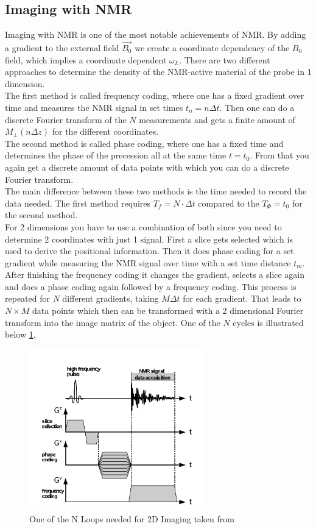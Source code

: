 \subsection{Imaging with NMR}\label{imagening}
Imaging with NMR is one of the most notable achievements of NMR. By adding a gradient to the external field $\vec{B_0}$ we create a coordinate dependency of the $B_0$ field, which implies a coordinate dependent $\omega_L$. There are two different approaches to determine the density of the NMR-active material of the probe in 1 dimension.
\vspace{2mm}\\
The first method is called frequency coding, where one has a fixed gradient over time and measures the  NMR signal in set times $t_n = n \Delta t$. Then one can do a discrete Fourier transform of the $N$ measurements and gets a finite amount of $M_{\perp}(n \Delta z)$ for the different coordinates. 
\vspace{2mm}\\
The second method is called phase coding, where one has a fixed time and determines the phase of the precession all at the same time $t = t_0$. From that you again get a discrete amount of data points with which you can do a discrete Fourier transform. 
\vspace{2mm}\\
The main difference between these two methods is the time needed to record the data needed. The first method requires $T_f = N \cdot \Delta t$ compared to the $T_{\Phi} = t_0$ for the second method.
\vspace{3mm}\\
For 2 dimensions you have to use a combination of both since you need to determine 2 coordinates with just 1 signal. First a slice gets selected which is used to derive the positional information. Then it does phase coding for a set gradient while measuring the NMR signal over time with a set time distance $t_m$. After finishing the frequency coding it changes the gradient, selects a slice again and does a phase coding again followed by a frequency coding. This process is repeated for $N$ different gradients, taking $M \Delta t$ for each gradient. That leads to $N \times M$ data points which then can be transformed with a 2 dimensional Fourier transform into the image matrix of the object. One of the $N$ cycles is illustrated below \ref{2dfourier}.\\
\begin{figure}[h]
	\centering
	\includegraphics[width=0.63\linewidth ,height=7cm]{images/2d_fourier.png}
	\caption{One of the N Loops needed for 2D Imaging taken from \cite{manual}}
	\label{2dfourier}
\end{figure}